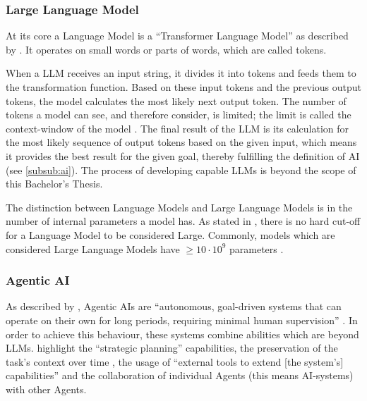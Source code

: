 \documentclass[
	fontsize = 11pt,
	paper = a4,
	draft = false,
	twoside = true,
	titlepage = false
]{scrartcl}
\numberwithin{equation}{subsection}
\begin{document}
	\subsubsection{Large Language Model} \label{subsub:llm}
	At its core a Language Model is a \enquote{Transformer Language Model} \autocite{zhao2026surveylargelanguagemodels} as described by \citeauthor{zhao2026surveylargelanguagemodels}. It operates on small words or parts of words, which are called \glspl{token}.
	
	When a \gls{LLM} receives an input string, it divides it into \glspl{token} and feeds them to the transformation function. Based on these input \glspl{token} and the previous output \glspl{token}, the model calculates the most likely next output \gls{token}. The number of \glspl{token} a model can see, and therefore consider, is limited; the limit is called the \gls{context-window} of the model \autocite{howLLMwork}. The final result of the \gls{LLM} is its calculation for the most likely sequence of output \glspl{token} based on the given input, which means it provides the best result for the given goal, thereby fulfilling the definition of \gls{AI} (see \autoref{subsub:ai}). The process of developing capable \gls{LLM}s is beyond the scope of this Bachelor's Thesis.
	
	The distinction between Language Models and Large Language Models is in the number of internal parameters a model has. As stated in  \autocite{zhao2026surveylargelanguagemodels}, there is no hard cut-off for a Language Model to be considered Large. Commonly, models which are considered Large Language Models have $\geq 10 \cdot 10^{9}$ parameters \autocite{zhao2026surveylargelanguagemodels}.
	
	\subsubsection{Agentic \gls{AI}} \label{subsub:Agentic}
	As described by \citeauthor{agenticAiDefinitions}, Agentic \gls{AI}s are \enquote{autonomous, goal-driven systems that can operate on their own for long periods, requiring minimal human supervision} \autocite[3. Results]{agenticAiDefinitions}. In order to achieve this behaviour, these systems combine abilities which are beyond \gls{LLM}s. \citeauthor{agenticAiDefinitions} highlight the \enquote{strategic planning} \autocite[3. Results]{agenticAiDefinitions} capabilities, the preservation of the task's context over time \autocite{agenticAiDefinitions}, the usage of \enquote{external tools to extend [the system's] capabilities} \autocite[3. Results]{agenticAiDefinitions} and the collaboration of individual Agents (this means \gls{AI}-systems) with other Agents. \autocite{agenticAiDefinitions}
	
\end{document}
